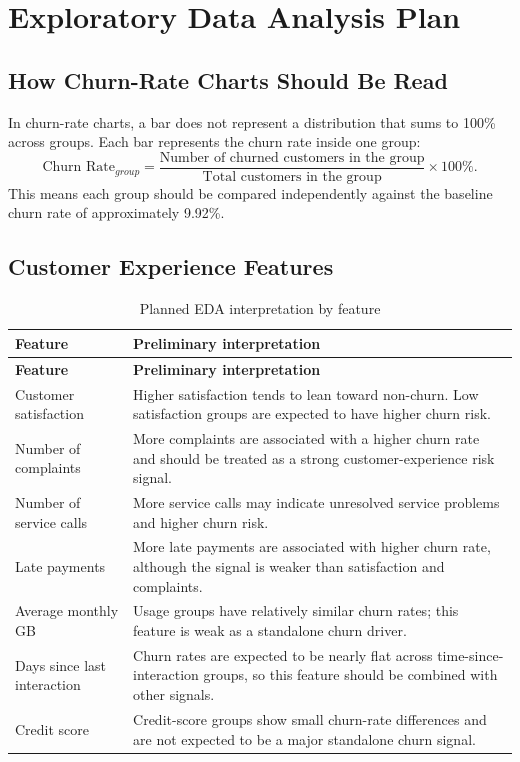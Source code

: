 \section{Exploratory Data Analysis Plan}

\subsection{How Churn-Rate Charts Should Be Read}
In churn-rate charts, a bar does not represent a distribution that sums to
100\% across groups. Each bar represents the churn rate inside one group:
\[
  \text{Churn Rate}_{group}
  =
  \frac{\text{Number of churned customers in the group}}
       {\text{Total customers in the group}}
  \times 100\%.
\]
This means each group should be compared independently against the baseline
churn rate of approximately 9.92\%.

\subsection{Customer Experience Features}
\begin{longtable}{p{}p{}}
\caption{Planned EDA interpretation by feature}\\
\toprule
\textbf{Feature} & \textbf{Preliminary interpretation} \\
\midrule
\endfirsthead
\toprule
\textbf{Feature} & \textbf{Preliminary interpretation} \\
\midrule
\endhead
Customer satisfaction &
Higher satisfaction tends to lean toward non-churn. Low satisfaction groups are
expected to have higher churn risk. \\
Number of complaints &
More complaints are associated with a higher churn rate and should be treated as
a strong customer-experience risk signal. \\
Number of service calls &
More service calls may indicate unresolved service problems and higher churn
risk. \\
Late payments &
More late payments are associated with higher churn rate, although the signal is
weaker than satisfaction and complaints. \\
Average monthly GB &
Usage groups have relatively similar churn rates; this feature is weak as a
standalone churn driver. \\
Days since last interaction &
Churn rates are expected to be nearly flat across time-since-interaction
groups, so this feature should be combined with other signals. \\
Credit score &
Credit-score groups show small churn-rate differences and are not expected to be
a major standalone churn signal. \\
\bottomrule
\end{longtable}


